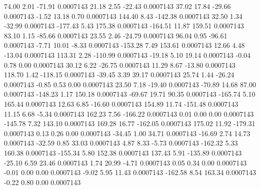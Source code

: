        74.00        2.01      -71.91     0.0007143
       21.18        2.55      -22.43     0.0007143
       37.02       17.84      -29.66     0.0007143
       -1.52       13.18        0.70     0.0007143
      144.40        8.43     -142.38     0.0007143
       32.50        1.34      -32.99     0.0007143
     -177.43        5.43      175.38     0.0007143
     -164.51       11.87      159.51     0.0007143
       83.10        1.15      -85.66     0.0007143
       23.55        2.46      -24.79     0.0007143
       96.04        0.95      -96.61     0.0007143
       -7.71       10.01       -8.33     0.0007143
     -153.28        7.49      153.61     0.0007143
       12.66        4.48      -13.04     0.0007143
      113.31        2.28     -110.99     0.0007143
      -19.18        5.10       19.14     0.0007143
       -0.04        0.78        0.00     0.0007143
       30.12        6.22      -26.75     0.0007143
       11.29        8.67      -13.80     0.0007143
      118.70        1.42     -118.15     0.0007143
      -39.45        3.39       39.17     0.0007143
       25.74        1.44      -26.24     0.0007143
       -0.85        0.53        0.00     0.0007143
       23.50        7.18      -19.40     0.0007143
      -70.89       14.68       87.00     0.0007143
     -148.23        1.17      150.18     0.0007143
      -69.67       19.71       90.35     0.0007143
     -165.74        5.10      165.44     0.0007143
       12.63        6.85      -16.60     0.0007143
      154.89       11.74     -151.48     0.0007143
       11.15        6.68       -5.34     0.0007143
      162.23        7.56     -166.22     0.0007143
        0.01        0.00        0.00     0.0007143
     -145.78        7.32      143.10     0.0007143
      169.28       16.77     -162.05     0.0007143
      175.02       11.92     -179.31     0.0007143
        0.13        0.26        0.00     0.0007143
      -34.45        1.00       34.71     0.0007143
      -16.69        2.74       14.73     0.0007143
      -32.59        0.85       33.03     0.0007143
        4.87        8.33       -5.73     0.0007143
     -162.32        5.33      160.38     0.0007143
     -155.34        5.80      152.38     0.0007143
      137.43        5.91     -135.89     0.0007143
      -25.10        6.59       23.46     0.0007143
        1.74       20.99       -4.71     0.0007143
        0.05        0.34        0.00     0.0007143
       -0.01        0.00        0.00     0.0007143
       -9.02        5.95       11.43     0.0007143
     -162.58        8.54      163.34     0.0007143
       -0.22        0.80        0.00     0.0007143
